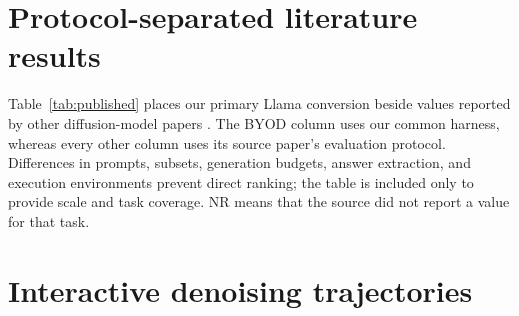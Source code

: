 \documentclass{article}
\begin{document}
\section{Protocol-separated literature results}
\label{app:published-results}

Table~\ref{tab:published} places our primary Llama conversion beside values reported by other diffusion-model papers \citep{nie2025llada,ye2025dream,nie2026illada,fu2025efficientdlm}. The BYOD column uses our common harness, whereas every other column uses its source paper's evaluation protocol. Differences in prompts, subsets, generation budgets, answer extraction, and execution environments prevent direct ranking; the table is included only to provide scale and task coverage. NR means that the source did not report a value for that task.

\begin{table}[h]
\caption{Our Llama result and protocol-separated published diffusion-model accuracies. Bold marks the largest reported value in each row; it does not imply a controlled comparison. No cross-task averages are shown because task coverage differs by model.}
\label{tab:published}
\centering
\scriptsize
{}
\end{table}

\section{Interactive denoising trajectories}
\label{app:demo-trajectories}
\end{document}
